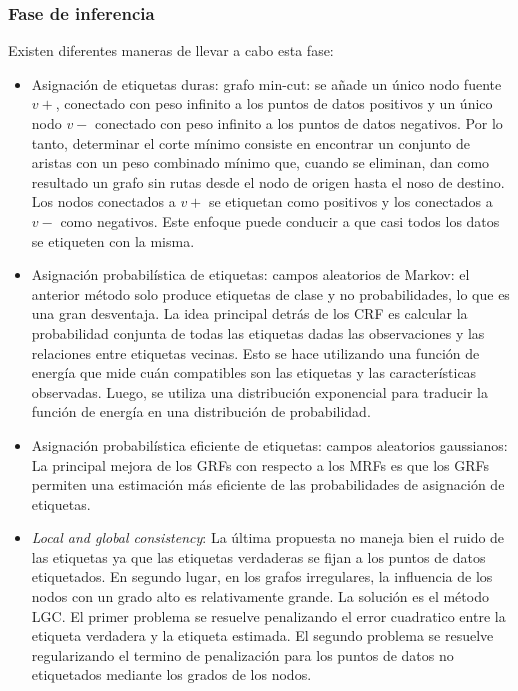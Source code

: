 \subsubsection{Fase de inferencia}
Existen diferentes maneras de llevar a cabo esta fase:
\begin{itemize}
	\item Asignación de etiquetas duras: grafo min-cut: se añade un único nodo fuente $v+$, conectado con peso infinito a los puntos de datos positivos y un único nodo $v-$ conectado con peso infinito a los puntos de datos negativos. Por lo tanto, determinar el corte mínimo consiste en encontrar un conjunto de aristas con un peso combinado mínimo que, cuando se eliminan, dan como resultado un grafo sin rutas desde el nodo de origen hasta el noso de destino. Los nodos conectados a $v+$ se etiquetan como positivos y los conectados a $v-$ como negativos. Este enfoque puede conducir a que casi todos los datos se etiqueten con la misma.
	\item Asignación probabilística de etiquetas: campos aleatorios de Markov: el anterior método solo produce etiquetas de clase y no probabilidades, lo que es una gran desventaja. La idea principal detrás de los CRF es calcular la probabilidad conjunta de todas las etiquetas dadas las observaciones y las relaciones entre etiquetas vecinas. Esto se hace utilizando una función de energía que mide cuán compatibles son las etiquetas y las características observadas. Luego, se utiliza una distribución exponencial para traducir la función de energía en una distribución de probabilidad.
	\item Asignación probabilística eficiente de etiquetas: campos aleatorios gaussianos: La principal mejora de los GRFs con respecto a los MRFs es que los GRFs permiten una estimación más eficiente de las probabilidades de asignación de etiquetas.
	\item\textit{ Local and global consistency}: La última propuesta no maneja bien el ruido de las etiquetas ya que las etiquetas verdaderas se fijan a los puntos de datos etiquetados. En segundo lugar, en los grafos irregulares, la influencia de los nodos con un grado alto es relativamente grande. La solución es el método LGC. El primer problema se resuelve penalizando el error cuadratico entre la etiqueta verdadera y la etiqueta estimada. El segundo problema se resuelve regularizando el termino de penalización para los puntos de datos no etiquetados mediante los grados de los nodos.
\end{itemize}


